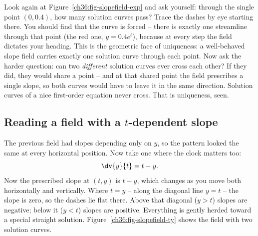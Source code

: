 \begin{walkbox}
Look again at Figure~\ref{ch36:fig-slopefield-exp} and ask yourself: through the single point $(0, 0.4)$, how many solution curves pass? Trace the dashes by eye starting there. You should find that the curve is forced -- there is exactly one streamline through that point (the red one, $y=0.4e^t$), because at every step the field dictates your heading. This is the geometric face of uniqueness: a well-behaved slope field carries exactly one solution curve through each point. Now ask the harder question: can two \emph{different} solution curves ever cross each other? If they did, they would share a point -- and at that shared point the field prescribes a single slope, so both curves would have to leave it in the same direction. Solution curves of a nice first-order equation never cross. That is uniqueness, seen.
\end{walkbox}

\subsection{Reading a field with a $t$-dependent slope}

The previous field had slopes depending only on $y$, so the pattern looked the same at every horizontal position. Now take one where the clock matters too:
\[
  \dv{y}{t} = t - y.
\]
Now the prescribed slope at $(t,y)$ is $t - y$, which changes as you move both horizontally and vertically. Where $t = y$ -- along the diagonal line $y=t$ -- the slope is zero, so the dashes lie flat there. Above that diagonal ($y > t$) slopes are negative; below it ($y<t$) slopes are positive. Everything is gently herded toward a special straight solution. Figure~\ref{ch36:fig-slopefield-ty} shows the field with two solution curves.

